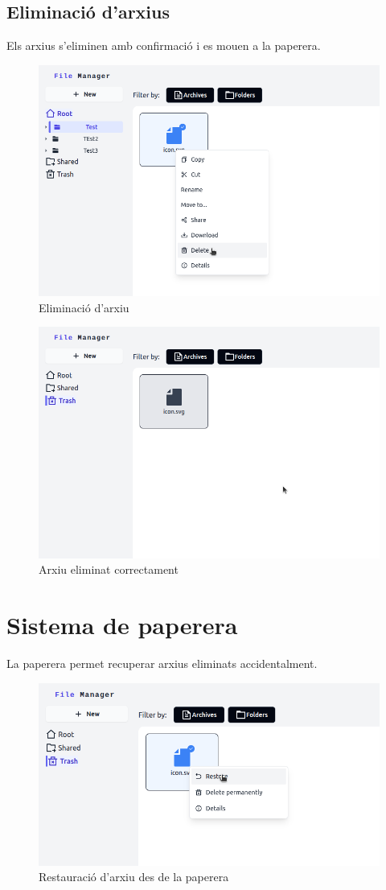 \subsection{Eliminació d'arxius}

Els arxius s'eliminen amb confirmació i es mouen a la paperera.

\begin{figure}[H]
\centering
\includegraphics[width=0.7\linewidth]{Figures/implementacio/deleteFile.png}
\caption{Eliminació d'arxiu}
\label{fig:deleteFile}
\end{figure}

\begin{figure}[H]
\centering
\includegraphics[width=0.7\linewidth]{Figures/implementacio/deletesuccess.png}
\caption{Arxiu eliminat correctament}
\label{fig:deletesuccess}
\end{figure}

\section{Sistema de paperera}

La paperera permet recuperar arxius eliminats accidentalment.

\begin{figure}[H]
\centering
\includegraphics[width=0.7\linewidth]{Figures/implementacio/restoreFile.png}
\caption{Restauració d'arxiu des de la paperera}
\label{fig:restoreFile}
\end{figure}

